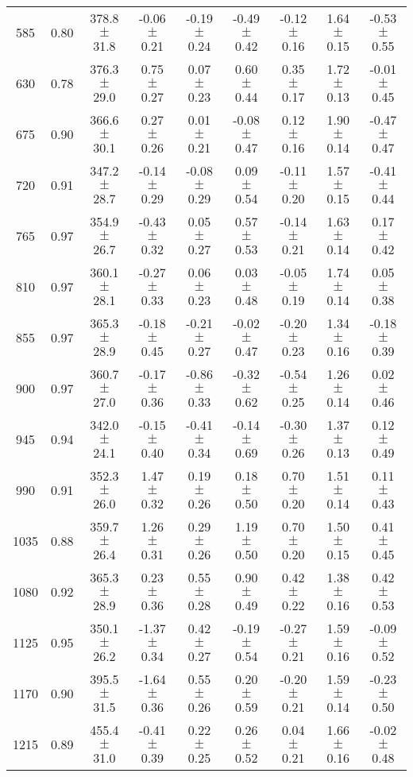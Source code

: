 \documentclass[twocolumn]{aastex61}%
\begin{document}
\begin{table*}[ht]
\begin{tabular}{ccc|ccccc|c}
585 & 0.80 & 378.8 $\pm$ 31.8 & -0.06 $\pm$ 0.21 & -0.19 $\pm$ 0.24 & -0.49 $\pm$ 0.42 & -0.12 $\pm$ 0.16 & 1.64 $\pm$ 0.15 & -0.53 $\pm$ 0.55\\
630 & 0.78 & 376.3 $\pm$ 29.0 & 0.75 $\pm$ 0.27 & 0.07 $\pm$ 0.23 & 0.60 $\pm$ 0.44 & 0.35 $\pm$ 0.17 & 1.72 $\pm$ 0.13 & -0.01 $\pm$ 0.45\\
675 & 0.90 & 366.6 $\pm$ 30.1 & 0.27 $\pm$ 0.26 & 0.01 $\pm$ 0.21 & -0.08 $\pm$ 0.47 & 0.12 $\pm$ 0.16 & 1.90 $\pm$ 0.14 & -0.47 $\pm$ 0.47\\
720 & 0.91 & 347.2 $\pm$ 28.7 & -0.14 $\pm$ 0.29 & -0.08 $\pm$ 0.29 & 0.09 $\pm$ 0.54 & -0.11 $\pm$ 0.20 & 1.57 $\pm$ 0.15 & -0.41 $\pm$ 0.44\\
765 & 0.97 & 354.9 $\pm$ 26.7 & -0.43 $\pm$ 0.32 & 0.05 $\pm$ 0.27 & 0.57 $\pm$ 0.53 & -0.14 $\pm$ 0.21 & 1.63 $\pm$ 0.14 & 0.17 $\pm$ 0.42\\
810 & 0.97 & 360.1 $\pm$ 28.1 & -0.27 $\pm$ 0.33 & 0.06 $\pm$ 0.23 & 0.03 $\pm$ 0.48 & -0.05 $\pm$ 0.19 & 1.74 $\pm$ 0.14 & 0.05 $\pm$ 0.38\\
855 & 0.97 & 365.3 $\pm$ 28.9 & -0.18 $\pm$ 0.45 & -0.21 $\pm$ 0.27 & -0.02 $\pm$ 0.47 & -0.20 $\pm$ 0.23 & 1.34 $\pm$ 0.16 & -0.18 $\pm$ 0.39\\
900 & 0.97 & 360.7 $\pm$ 27.0 & -0.17 $\pm$ 0.36 & -0.86 $\pm$ 0.33 & -0.32 $\pm$ 0.62 & -0.54 $\pm$ 0.25 & 1.26 $\pm$ 0.14 & 0.02 $\pm$ 0.46\\
945 & 0.94 & 342.0 $\pm$ 24.1 & -0.15 $\pm$ 0.40 & -0.41 $\pm$ 0.34 & -0.14 $\pm$ 0.69 & -0.30 $\pm$ 0.26 & 1.37 $\pm$ 0.13 & 0.12 $\pm$ 0.49\\
990 & 0.91 & 352.3 $\pm$ 26.0 & 1.47 $\pm$ 0.32 & 0.19 $\pm$ 0.26 & 0.18 $\pm$ 0.50 & 0.70 $\pm$ 0.20 & 1.51 $\pm$ 0.14 & 0.11 $\pm$ 0.43\\
1035 & 0.88 & 359.7 $\pm$ 26.4 & 1.26 $\pm$ 0.31 & 0.29 $\pm$ 0.26 & 1.19 $\pm$ 0.50 & 0.70 $\pm$ 0.20 & 1.50 $\pm$ 0.15 & 0.41 $\pm$ 0.45\\
1080 & 0.92 & 365.3 $\pm$ 28.9 & 0.23 $\pm$ 0.36 & 0.55 $\pm$ 0.28 & 0.90 $\pm$ 0.49 & 0.42 $\pm$ 0.22 & 1.38 $\pm$ 0.16 & 0.42 $\pm$ 0.53\\
1125 & 0.95 & 350.1 $\pm$ 26.2 & -1.37 $\pm$ 0.34 & 0.42 $\pm$ 0.27 & -0.19 $\pm$ 0.54 & -0.27 $\pm$ 0.21 & 1.59 $\pm$ 0.16 & -0.09 $\pm$ 0.52\\
1170 & 0.90 & 395.5 $\pm$ 31.5 & -1.64 $\pm$ 0.36 & 0.55 $\pm$ 0.26 & 0.20 $\pm$ 0.59 & -0.20 $\pm$ 0.21 & 1.59 $\pm$ 0.14 & -0.23 $\pm$ 0.50\\
1215 & 0.89 & 455.4 $\pm$ 31.0 & -0.41 $\pm$ 0.39 & 0.22 $\pm$ 0.25 & 0.26 $\pm$ 0.52 & 0.04 $\pm$ 0.21 & 1.66 $\pm$ 0.16 & -0.02 $\pm$ 0.48\\

\end{tabular}
\end{table*}
\end{document}

